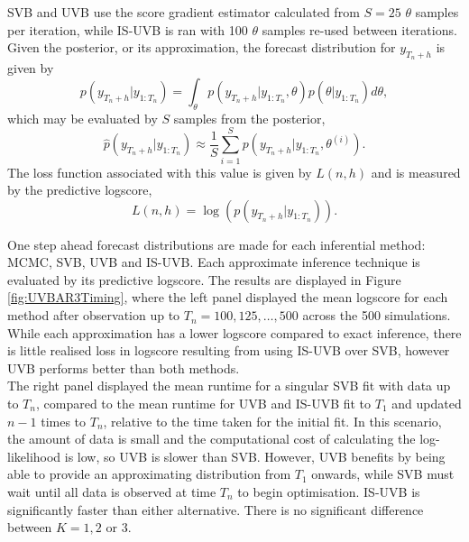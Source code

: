 \documentclass[
12pt, %
onehalfspacing, %
nohyperref, %
headsepline, %
chapterinoneline, %
]{MastersDoctoralThesis} %
\begin{document}
SVB and UVB use the score gradient estimator calculated from $S = 25$ $\theta$ samples per iteration, while IS-UVB is ran with 100 $\theta$ samples re-used between iterations.
\\

Given the posterior, or its approximation, the forecast distribution for $y_{T_n+h}$ is given by
\begin{equation}
\label{UVB:TSforecastDist}
p(y_{T_n + h} | y_{1:T_n}) = \int_{\theta} p(y_{T_n + h} | y_{1:T_n}, \theta)p(\theta | y_{1:T_n})d\theta,
\end{equation}
which may be evaluated by $S$ samples from the posterior,
\begin{equation}
\label{UVB:TSforecastDistApprox}
\hat{p}(y_{T_n + h} | y_{1:T_n}) \approx \frac{1}{S} \sum_{i=1}^S  p(y_{T_n + h} | y_{1:T_n}, \theta^{(i)}).
\end{equation}
The loss function associated with this value is given by $L(n, h)$ and is measured by the predictive logscore,
\begin{equation}
\label{UVB:TSlogscore}
L(n, h) = \log(p(y_{T_n + h} | y_{1:T_n})).
\end{equation}

One step ahead forecast distributions are made for each inferential method: MCMC, SVB, UVB and IS-UVB. Each approximate inference technique is evaluated by its predictive logscore. The results are displayed in Figure \ref{fig:UVBAR3Timing}, where the left panel displayed the mean logscore for each method after observation up to $T_n = 100, 125, \ldots, 500$ across the 500 simulations. While each approximation has a lower logscore compared to exact inference, there is little realised loss in logscore resulting from using IS-UVB over SVB, however UVB performs better than both methods.
\\

The right panel displayed the mean runtime for a singular SVB fit with data up to $T_n$, compared to the mean runtime for UVB and IS-UVB fit to $T_1$ and updated $n-1$ times to $T_n$, relative to the time taken for the initial fit. In this scenario, the amount of data is small and the computational cost of calculating the log-likelihood is low, so UVB is slower than SVB. However, UVB benefits by being able to provide an approximating distribution from $T_1$ onwards, while SVB must wait until all data is observed at time $T_n$ to begin optimisation. IS-UVB is significantly faster than either alternative. There is no significant difference between $K = 1, 2 $ or $3$.   
\end{document}
